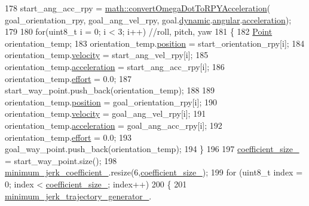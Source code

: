 \begin{DoxyCode}
178   start\_ang\_acc\_rpy = \hyperlink{namespacerobotis__manipulator_1_1math_aabd3cc7c059a6372e917bc98a3e5c1dd}{math::convertOmegaDotToRPYAcceleration}(
      goal\_orientation\_rpy, goal\_ang\_vel\_rpy, goal.\hyperlink{structrobotis__manipulator_1_1_pose_a8accf10d21933e07ade2728fcccf4ae6}{dynamic}.\hyperlink{structrobotis__manipulator_1_1_dynamic_pose_a424459b0d1108f1e65594f5d193cbae6}{angular}.\hyperlink{structrobotis__manipulator_1_1_dynamicvector_afc83eba2d67af4c23150a08824f0f01e}{acceleration});
179 
180   \textcolor{keywordflow}{for}(uint8\_t i = 0; i < 3; i++)    \textcolor{comment}{//roll, pitch, yaw}
181   \{
182     \hyperlink{structrobotis__manipulator_1_1_point}{Point} orientation\_temp;
183     orientation\_temp.\hyperlink{structrobotis__manipulator_1_1_point_a0f122386b502d9b316bdead542ed2145}{position} = start\_orientation\_rpy[i];
184     orientation\_temp.\hyperlink{structrobotis__manipulator_1_1_point_a4eaec95fac0c755eb0aa704b36ebe97b}{velocity} = start\_ang\_vel\_rpy[i];
185     orientation\_temp.\hyperlink{structrobotis__manipulator_1_1_point_adb49f1fbcc0eaa7f530c54fdf0ede836}{acceleration} = start\_ang\_acc\_rpy[i];
186     orientation\_temp.\hyperlink{structrobotis__manipulator_1_1_point_add1a7019fc87cc2ac9bdf033372a9bb6}{effort} = 0.0;
187     start\_way\_point.push\_back(orientation\_temp);
188 
189     orientation\_temp.\hyperlink{structrobotis__manipulator_1_1_point_a0f122386b502d9b316bdead542ed2145}{position} = goal\_orientation\_rpy[i];
190     orientation\_temp.\hyperlink{structrobotis__manipulator_1_1_point_a4eaec95fac0c755eb0aa704b36ebe97b}{velocity} = goal\_ang\_vel\_rpy[i];
191     orientation\_temp.\hyperlink{structrobotis__manipulator_1_1_point_adb49f1fbcc0eaa7f530c54fdf0ede836}{acceleration} = goal\_ang\_acc\_rpy[i];
192     orientation\_temp.\hyperlink{structrobotis__manipulator_1_1_point_add1a7019fc87cc2ac9bdf033372a9bb6}{effort} = 0.0;
193     goal\_way\_point.push\_back(orientation\_temp);
194   \}
196 
197   \hyperlink{classrobotis__manipulator_1_1_task_trajectory_a3e18bd8e5e8b327d15afd8831ba099f5}{coefficient\_size\_} = start\_way\_point.size();
198   \hyperlink{classrobotis__manipulator_1_1_task_trajectory_a19c6e0525c29db0b3bad7950baa74e42}{minimum\_jerk\_coefficient\_}.resize(6,\hyperlink{classrobotis__manipulator_1_1_task_trajectory_a3e18bd8e5e8b327d15afd8831ba099f5}{coefficient\_size\_});
199   \textcolor{keywordflow}{for} (uint8\_t index = 0; index < \hyperlink{classrobotis__manipulator_1_1_task_trajectory_a3e18bd8e5e8b327d15afd8831ba099f5}{coefficient\_size\_}; index++)
200   \{
201     \hyperlink{classrobotis__manipulator_1_1_task_trajectory_aa616787d639765003bd054cc7c59f6d3}{minimum\_jerk\_trajectory\_generator\_}.

\end{DoxyCode}
